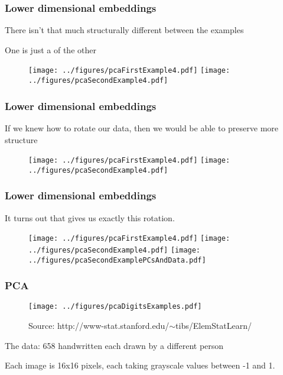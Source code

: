 \documentclass[12pt]{beamer}
\begin{document}
\begin{frame}[fragile]
\frametitle{Lower dimensional embeddings}
There isn't that much structurally different between the examples

\vsp
One is just a  of the other
\begin{figure}
\centering
\texttt{[image: ../figures/pcaFirstExample4.pdf]}
\texttt{[image: ../figures/pcaSecondExample4.pdf]}
\end{figure}
\end{frame}

\begin{frame}[fragile]
\frametitle{Lower dimensional embeddings}
If we knew how to rotate our data,  then we would be able to preserve more structure
\begin{figure}
\centering
\texttt{[image: ../figures/pcaFirstExample4.pdf]}
\texttt{[image: ../figures/pcaSecondExample4.pdf]}
\end{figure}
\end{frame}

\begin{frame}[fragile]
\frametitle{Lower dimensional embeddings}
It turns out that  gives us exactly this rotation.\begin{figure}
\centering
\texttt{[image: ../figures/pcaFirstExample4.pdf]}
\texttt{[image: ../figures/pcaSecondExample4.pdf]}
\texttt{[image: ../figures/pcaSecondExamplePCsAndData.pdf]}
\end{figure}

\end{frame}




\begin{frame}[fragile]
\frametitle{PCA}
\begin{figure}
\centering
\texttt{[image: ../figures/pcaDigitsExamples.pdf]}
\caption*{Source: http://www-stat.stanford.edu/$\sim$tibs/ElemStatLearn/}
\end{figure}

The data: 658 handwritten  each drawn by a different person

\vsp
Each image is 16x16 pixels, each taking grayscale values between -1 and 1.
\end{frame}
\end{document}
